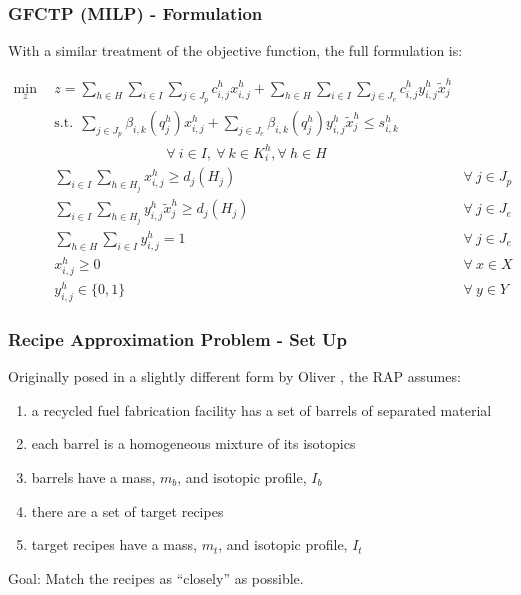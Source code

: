 \begin{frame}[ctb!]
  \frametitle{GFCTP (MILP) - Formulation} 
  
  With a similar treatment of the objective function, the full formulation is:
  
  \begin{subequations}\label{eqs:GFCTP-E}
    \begin{align}
      \label{eq:GRCTP-E_obj}
      \min_{z} \:\: 
      & 
      z = \sum_{h \in H}\sum_{i \in I}\sum_{j \in J_{p}}c_{i,j}^{h} x_{i,j}^{h} 
      + \sum_{h \in H}\sum_{i \in I}\sum_{j \in J_{e}}c_{i,j}^{h} y_{i,j}^{h} \tilde{x}_{j}^{h}
      && \\
      \label{eq:GRCTP-E_sup}
      &
      \text{s.t.} \:\: 
      \sum_{j \in J_{p}}\beta_{i,k}(q_{j}^{h}) x_{i,j}^{h}
      + \sum_{j \in J_{e}}\beta_{i,k}(q_{j}^{h}) y_{i,j}^{h} \tilde{x}_{j}^{h} \leq s_{i,k}^{h} \nonumber \\
      &
      \qquad\qquad\qquad\qquad
      \forall \: i \in I, \: \forall \: k \in K_{i}^{h}, \forall \: {h \in H}\\
      \label{eq:GRCTP-E_dem_p}
      &
      \sum_{i \in I}\sum_{h \in H_{j}} x_{i,j}^{h} \geq d_{j}(H_{j})
      &
      \forall \: j \in J_{p} &\\
      \label{eq:GRCTP-E_dem_e}
      &
      \sum_{i \in I}\sum_{h \in H_{j}} y_{i,j}^{h} \tilde{x}_{j}^{h} \geq d_{j}(H_{j}) 
      &
      \forall \: j \in J_{e}  &\\
      \label{eq:GRCTP-E_sumy}
      &
      \sum_{h \in H}\sum_{i \in I} y_{i,j}^{h} = 1
      &
      \forall \: j \in J_{e}  &\\
      \label{eq:GRCTP-E_x}
      &
      x_{i,j}^{h} \geq 0
      &
      \forall \: x \in X  &\\
      \label{eq:GRCTP-E_y}
      &
      y_{i,j}^{h} \in \{0,1\}
      &
      \forall \: y \in Y &
    \end{align}
  \end{subequations}

\end{frame}

\begin{frame}[ctb!]
  \frametitle{Recipe Approximation Problem - Set Up} 

  Originally posed in a slightly different form by Oliver
  \cite{oliver_geniusv2:_2009}, the RAP assumes:
  \begin{enumerate}
    \item a recycled fuel fabrication facility has a set of barrels of separated
      material
    \item each barrel is a homogeneous mixture of its isotopics
    \item barrels have a mass, $m_b$, and isotopic profile, $I_b$
    \item there are a set of target recipes
    \item target recipes have a mass, $m_t$, and isotopic profile, $I_t$
  \end{enumerate}

  Goal: Match the recipes as ``closely'' as possible.
\end{frame}

